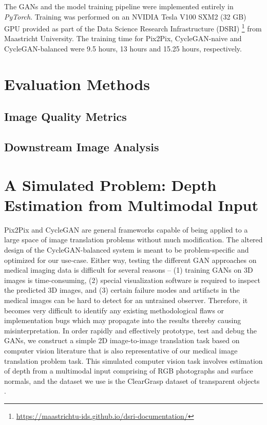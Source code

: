 The GANs and the model training pipeline were implemented entirely in \textit{PyTorch}. Training was performed on an NVIDIA Tesla V100 SXM2 (32 GB) GPU provided as part of the Data Science Research Infrastructure (DSRI) \footnote{\url{https://maastrichtu-ids.github.io/dsri-documentation/}} from Maastricht University. The training time for Pix2Pix, CycleGAN-naive and CycleGAN-balanced were 9.5 hours, 13 hours and 15.25 hours, respectively. 



\section{Evaluation Methods}
\label{Evaluation_Methods}

\subsection{Image Quality Metrics}
\label{image_quality_metrics}

\subsection{Downstream Image Analysis}



\section{A Simulated Problem: Depth Estimation from Multimodal Input}

Pix2Pix and CycleGAN are general frameworks capable of being applied to a large space of image translation problems without much modification. The altered design of the CycleGAN-balanced system is meant to be problem-specific and optimized for our use-case. Either way, testing the different GAN approaches on medical imaging data is difficult for several reasons -- (1) training GANs on 3D images is time-consuming, (2) special visualization software is required to inspect the predicted 3D images, and (3) certain failure modes and artifacts in the medical images can be hard to detect for an untrained observer. Therefore, it becomes very difficult to identify any existing methodological flaws or implementation bugs which may propagate into the results thereby causing misinterpretation. In order rapidly and effectively prototype, test and debug the GANs, we construct a simple 2D image-to-image translation task based on computer vision literature that is also representative of our medical image translation problem task. This simulated computer vision task involves estimation of depth from a multimodal input comprising of RGB photographs and surface normals, and the dataset we use is the ClearGrasp dataset of transparent objects \cite{sajjan2020clear}.

